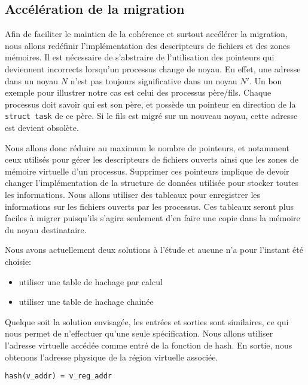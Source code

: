     \subsection{Accélération de la migration}

      Afin de faciliter le maintien de la cohérence et surtout accélérer la
      migration, nous allons redéfinir l'implémentation des descripteurs de
      fichiers et des zones mémoires. Il est nécessaire de s'abstraire de
      l'utilisation des pointeurs qui deviennent incorrects lorsqu'un processus
      change de noyau. En effet, une adresse dans un noyau $N$ n'est pas
      toujours significative dans un noyau $N'$. Un bon exemple pour illustrer
      notre cas est celui des processus père/fils. Chaque processus doit savoir
      qui est son père, et possède un pointeur en direction de la \texttt{struct
        task} de ce père. Si le fils est migré sur un nouveau noyau, cette
      adresse est devient obsolète.

      Nous allons donc réduire au maximum le nombre de pointeurs, et notamment
      ceux utilisés pour gérer les descripteurs de fichiers ouverts ainsi que
      les zones de mémoire virtuelle d'un processus. Supprimer ces pointeurs
      implique de devoir changer l'implémentation de la structure de données
      utilisée pour stocker toutes les informations. Nous allons utiliser des
      tableaux pour enregistrer les informations sur les fichiers ouverts par
      les processus. Ces tableaux seront plus faciles à migrer puisqu'ils
      s'agira seulement d'en faire une copie dans la mémoire du noyau
      destinataire.

      Nous avons actuellement deux solutions à l'étude et aucune n'a pour
      l'instant été choisie:
      \begin{itemize}
        \item utiliser une table de hachage par calcul
        \item utiliser une table de hachage chainée
      \end{itemize}

      Quelque soit la solution envisagée, les entrées et sorties sont
      similaires, ce qui nous permet de n'effectuer qu'une seule
      spécification. Nous allons utiliser l'adresse virtuelle accédée comme
      entré de la fonction de hash. En sortie, nous obtenons l'adresse physique
      de la région virtuelle associée.

      \begin{center}
        \texttt{hash(v\_addr) = v\_reg\_addr}
      \end{center}

